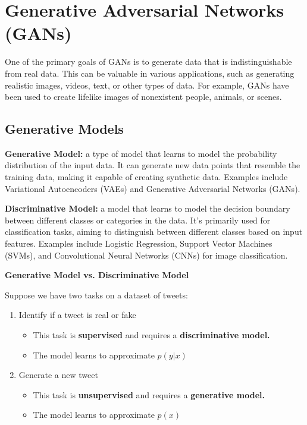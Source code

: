 
\chapter{Generative Adversarial Networks (GANs)}

\begin{idea}
    One of the primary goals of GANs is to generate data that is indistinguishable from real data. This can be valuable in various applications, such as generating realistic images, videos, text, or other types of data. For example, GANs have been used to create lifelike images of nonexistent people, animals, or scenes.
\end{idea}

\section{Generative Models}

\begin{definition}
    \textbf{Generative Model:} a type of model that learns to model the probability distribution of the input data. It can generate new data points that resemble the training data, making it capable of creating synthetic data. Examples include Variational Autoencoders (VAEs) and Generative Adversarial Networks (GANs).
\end{definition}

\begin{definition}
    \textbf{Discriminative Model:} a model that learns to model the decision boundary between different classes or categories in the data. It's primarily used for classification tasks, aiming to distinguish between different classes based on input features. Examples include Logistic Regression, Support Vector Machines (SVMs), and Convolutional Neural Networks (CNNs) for image classification.
\end{definition}

\noindent \textbf{Generative Model vs. Discriminative Model}

Suppose we have two tasks on a dataset of tweets:
\begin{enumerate}
    \item Identify if a tweet is real or fake
    \begin{itemize}
        \item This task is \textbf{supervised} and requires a \textbf{discriminative model.}
        \item The model learns to approximate \textbf{$p(y|x)$}
    \end{itemize}
    \item Generate a new tweet
    \begin{itemize}
        \item This task is \textbf{unsupervised} and requires a \textbf{generative model.}
        \item The model learns to approximate $p(x)$
    \end{itemize}
\end{enumerate}

